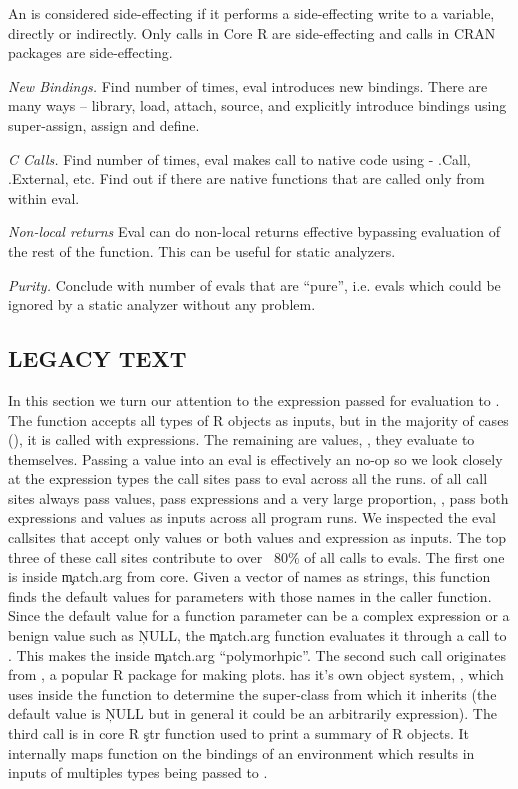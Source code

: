 \documentclass[USenglish,cleveref, autoref, thm-restate]{lipics-v2019}
\newcommand{\mypara}[1]{\medskip\noindent\emph{#1}\xspace}
\begin{document}
An \eval is considered side-effecting if it performs a side-effecting
write to a variable, directly or indirectly. Only
\SideEffectingCoreCallPerc \eval calls in Core R are side-effecting
and \SideEffectingPackageCallPerc \eval calls in CRAN packages are
side-effecting.


\mypara{New Bindings.} Find number of times, eval introduces new
bindings. There are many ways -- library, load, attach, source, and
explicitly introduce bindings using super-assign, assign and define.

\mypara{C Calls.} Find number of times, eval makes call to native code
using - .Call, .External, etc. Find out if there are native functions
that are called only from within eval.

\mypara{Non-local returns}
Eval can do non-local returns effective bypassing evaluation of the
rest of the function. This can be useful for static analyzers.

\mypara{Purity.}
Conclude with number of evals that are ``pure'', i.e. evals which
could be ignored by a static analyzer without any problem.

\subsection{LEGACY TEXT}

In this section we turn our attention to the expression passed for
evaluation to \eval. The \eval function accepts all types of R objects
as inputs, but in the majority of cases
(\AllExpressionInputEvalCallPerc), it is called with expressions. The
remaining \AllValueInputEvalCallPerc are values, \ie, they evaluate to
themselves.
%
Passing a value into an eval is effectively an no-op so we look
closely at the expression types the call sites pass to eval across all
the runs. \AllValueInputEvalSitePerc of all call sites always pass
values, \AllExpressionInputEvalSitePerc pass expressions and a very
large proportion, \AllPolymorphicInputEvalSitePerc, pass both
expressions and values as inputs across all program runs. We inspected
the eval callsites that accept only values or both values and
expression as inputs. The top three of these call sites contribute to
over ~80\% of all calls to evals. The first one is inside
\c{match.arg} from core. Given a vector of names as strings, this
function finds the default values for parameters with those names in
the caller function. Since the default value for a function parameter
can be a complex expression or a benign value such as \c{NULL}, the
\c{match.arg} function evaluates it through a call to \eval. This
makes the \eval inside \c{match.arg} ``polymorhpic''. The second such
\eval call originates from \ggplot, a popular R package for making
plots. \ggplot has it's own object system, \ggproto, which uses \eval
inside the \ggproto function to determine the super-class from which
it inherits (the default value is \c{NULL} but in general it could be
an arbitrarily expression). The third \eval call is in core R \c{str}
function used to print a summary of R objects. It internally maps
\eval function on the bindings of an environment which results in
inputs of multiples types being passed to \eval.
\end{document}
